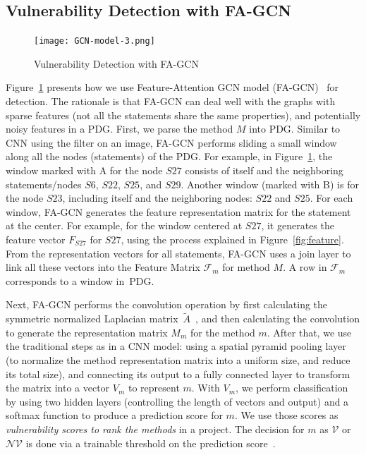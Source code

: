 \subsection{Vulnerability Detection with FA-GCN}
\label{model:sec}

\begin{figure}[t]
	\centering
	\texttt{[image: GCN-model-3.png]}
	\caption{Vulnerability Detection with FA-GCN}
	\label{fig:gcn}	
\end{figure}

Figure~\ref{fig:gcn} presents how we use Feature-Attention GCN model
(FA-GCN)~\cite{FAGCN} for detection. The rationale is that FA-GCN can
deal well with the graphs with sparse features (not all the statements
share the same properties), and potentially noisy features in a PDG.
First, we parse the method $M$ into PDG. Similar to CNN using the
filter on an image, FA-GCN performs sliding a small window along all
the nodes (statements) of the PDG. For example, in
Figure~\ref{fig:gcn}, the window marked with A for the node
$S27$ consists of itself and the neighboring statements/nodes $S6$,
$S22$, $S25$, and $S29$. Another window (marked with B) is
for the node $S23$, including itself and the neighboring nodes:
$S22$ and $S25$. For each window, FA-GCN generates the feature
representation matrix for the statement at the center. For example,
for the window centered at $S27$, it generates the feature vector
$F_{S27}$ for $S27$, using the process explained in
Figure~\ref{fig:feature}. From the representation vectors for
all statements, FA-GCN uses a join layer to link all these vectors
into the Feature Matrix $\mathcal{F}_{m}$ for method $M$. A row in
$\mathcal{F}_m$ corresponds to a window in~PDG.

Next, FA-GCN performs the convolution operation by first calculating
the symmetric normalized Laplacian matrix~$\tilde{A}$~\cite{GCN16},
and then calculating the convolution to generate the representation
matrix $M_{m}$ for the method $m$. After that, we use the traditional
steps as in a CNN model: using a spatial pyramid pooling layer (to
normalize the method representation matrix into a uniform size, and
reduce its total size), and connecting its output to a fully connected
layer to transform the matrix into a vector $V_m$ to represent
$m$. With $V_m$, we perform classification by using two hidden layers
(controlling the length of vectors and output) and a softmax function
to produce a prediction score for $m$. We use those scores as {\em
  vulnerability scores to rank the methods} in a project. The decision
for $m$ as $\mathcal{V}$ or $\mathcal{NV}$ is done via a trainable
threshold on the prediction score~\cite{li2018vuldeepecker,li2019improving}.

